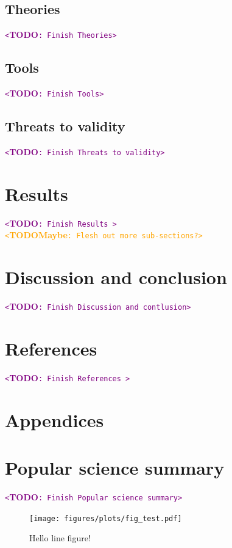 \documentclass[a4paper,11pt]{article}
\newcommand\TODO[1]{\textcolor{purple}{\texttt{<}\textbf{TODO}\texttt{: #1>}}}
\newcommand\TODOMaybe[1]{\textcolor{orange}{\texttt{<}\textbf{TODOMaybe}\texttt{: #1?>}}}
\begin{document}
  \subsection{Theories}
    \TODO{Finish Theories} \\
  \subsection{Tools}
    \TODO{Finish Tools} \\
  \subsection{Threats to validity}
    \TODO{Finish Threats to validity} \\

\section{Results}

  \TODO{Finish Results } \\
  \TODOMaybe{Flesh out more sub-sections} \\

\section{Discussion and conclusion}

  \TODO{Finish Discussion and contlusion} \\

\section{References }

  \TODO{Finish References } \\

\section{Appendices}


\section{Popular science summary}

  \TODO{Finish Popular science summary} \\

  \begin{figure}[H]
    \begin{center}
      \texttt{[image: figures/plots/fig\_test.pdf]}
      \caption{Hello line figure!}
    \end{center}
  \end{figure}
\end{document}
